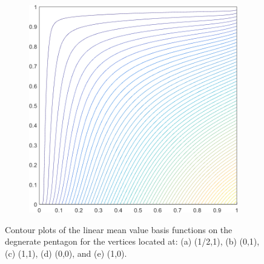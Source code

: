 \begin{figure}
\begin{subfigure}[b]{0.39\textwidth}
		\caption{}
	\end{subfigure}
	\hspace{1.5cm}
	\begin{subfigure}[b]{0.39\textwidth}
		\centering
		\includegraphics[width=\textwidth]{figures/sec_BF/deg_square_MV1_contour_b2.png}
		\caption{}
	\end{subfigure}
\caption{Contour plots of the linear mean value basis functions on the degnerate pentagon for the vertices located at: (a) (1/2,1), (b) (0,1), (c) (1,1), (d) (0,0), and (e) (1,0).}
\end{figure}

